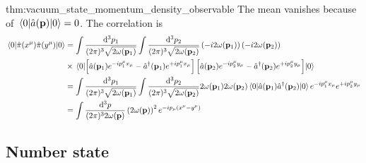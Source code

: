 \begin{delayedproof}{thm:vacuum_state_momentum_density_observable}
	The mean vanishes because of $\expval{\hat{a}(\vb{p})}{0}=0$. The correlation is
	\begin{equation*}
		\begin{split}
			\expval{\hat\pi(x^\mu)\hat\pi(y^\mu)}{0}
			&=
			\int\frac{\dd[3]{p_1}}{(2\pi)^3\sqrt{2\omega(\vb{p}_1)}}
			\int\frac{\dd[3]{p_2}}{(2\pi)^3\sqrt{2\omega(\vb{p}_2)}}
			\left(-i2\omega(\vb{p}_1)\right)
			\left(-i2\omega(\vb{p}_2)\right)
			\\
			&\times
			\expval{
				\left[
					\hat{a}(\vb{p}_1)
					e^{-ip_1^\mu x_\mu}
					-
					\hat{a}^\dagger(\vb{p}_1)
					e^{+ip_1^\mu x_\mu}
				\right]
				\left[
					\hat{a}(\vb{p}_2)
					e^{-ip_2^\mu y_\mu}
					-
					\hat{a}^\dagger(\vb{p}_2)
					e^{+ip_2^\mu y_\mu}
				\right]
			}{0}
			\\
			&=
			\int\frac{\dd[3]{p_1}}{(2\pi)^3\sqrt{2\omega(\vb{p}_1)}}
			\int\frac{\dd[3]{p_2}}{(2\pi)^3\sqrt{2\omega(\vb{p}_2)}}
			2\omega(\vb{p}_1)
			2\omega(\vb{p}_2)
			\expval{
				\hat{a}(\vb{p}_1)
				\hat{a}^\dagger(\vb{p}_2)
			}{0}
			e^{-ip_1^\mu x_\mu}
			e^{+ip_2^\mu y_\mu}
			\\
			&=
			\int\frac{\dd[3]{p}}{(2\pi)^32\omega(\vb{p})}
			\left(2\omega(\vb{p})\right)^2
			e^{-ip_\mu(x^\mu-y^\mu)}
		\end{split}
	\end{equation*}
\end{delayedproof}

\subsection{Number state}

